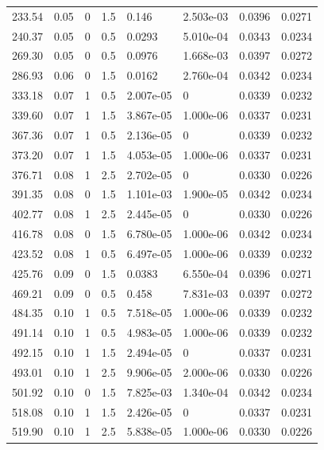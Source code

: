 \documentclass[preview]{standalone}
\begin{document}
{{\begin{tabular}{L{1.2cm}C{1.2cm} C{0.3cm}C{0.5cm} C{1.4cm}C{1.4cm} C{1.4cm}C{1.4cm}}
  233.54  &  0.05  & 0     & 1.5 &  0.146  & 2.503e-03  & 0.0396 &  0.0271   \\ 
  240.37  &  0.05  & 0     & 0.5 &  0.0293  & 5.010e-04  & 0.0343 &  0.0234   \\ 
  269.30  &  0.05  & 0     & 0.5 &  0.0976  & 1.668e-03  & 0.0397 &  0.0272   \\ 
  286.93  &  0.06  & 0     & 1.5 &  0.0162  & 2.760e-04  & 0.0342 &  0.0234   \\ 
  333.18  &  0.07  & 1     & 0.5 &  2.007e-05  & 0  & 0.0339 &  0.0232   \\ 
  339.60  &  0.07  & 1     & 1.5 &  3.867e-05  & 1.000e-06  & 0.0337 &  0.0231   \\ 
  367.36  &  0.07  & 1     & 0.5 &  2.136e-05  & 0  & 0.0339 &  0.0232   \\ 
  373.20  &  0.07  & 1     & 1.5 &  4.053e-05  & 1.000e-06  & 0.0337 &  0.0231   \\ 
  376.71  &  0.08  & 1     & 2.5 &  2.702e-05  & 0  & 0.0330 &  0.0226   \\ 
  391.35  &  0.08  & 0     & 1.5 &  1.101e-03  & 1.900e-05  & 0.0342 &  0.0234   \\ 
  402.77  &  0.08  & 1     & 2.5 &  2.445e-05  & 0  & 0.0330 &  0.0226   \\ 
  416.78  &  0.08  & 0     & 1.5 &  6.780e-05  & 1.000e-06  & 0.0342 &  0.0234   \\ 
  423.52  &  0.08  & 1     & 0.5 &  6.497e-05  & 1.000e-06  & 0.0339 &  0.0232   \\ 
  425.76  &  0.09  & 0     & 1.5 &  0.0383  & 6.550e-04  & 0.0396 &  0.0271   \\ 
  469.21  &  0.09  & 0     & 0.5 &  0.458  & 7.831e-03  & 0.0397 &  0.0272   \\ 
  484.35  &  0.10  & 1     & 0.5 &  7.518e-05  & 1.000e-06  & 0.0339 &  0.0232   \\ 
  491.14  &  0.10  & 1     & 0.5 &  4.983e-05  & 1.000e-06  & 0.0339 &  0.0232   \\ 
  492.15  &  0.10  & 1     & 1.5 &  2.494e-05  & 0  & 0.0337 &  0.0231   \\ 
  493.01  &  0.10  & 1     & 2.5 &  9.906e-05  & 2.000e-06  & 0.0330 &  0.0226   \\ 
  501.92  &  0.10  & 0     & 1.5 &  7.825e-03  & 1.340e-04  & 0.0342 &  0.0234   \\ 
  518.08  &  0.10  & 1     & 1.5 &  2.426e-05  & 0  & 0.0337 &  0.0231   \\ 
  519.90  &  0.10  & 1     & 2.5 &  5.838e-05  & 1.000e-06  & 0.0330 &  0.0226   \\ 

\end{tabular}}}
\end{document}
